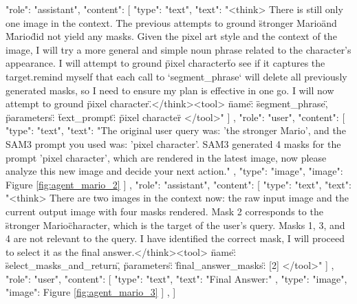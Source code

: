     {
        "role": "assistant",
        "content": [
            {
                "type": "text",
                "text": "<think> There is still only one image in the context. The previous attempts to ground \"stronger Mario\" and \"Mario\" did not yield any masks. Given the pixel art style and the context of the image, I will try a more general and simple noun phrase related to the character's appearance. I will attempt to ground \"pixel character\" to see if it captures the target.\n\nI remind myself that each call to `segment_phrase` will delete all previously generated masks, so I need to ensure my plan is effective in one go. I will now attempt to ground \"pixel character.\"\n\n</think>\n<tool> {\"name\": \"segment_phrase\", \"parameters\": {\"text_prompt\": \"pixel character\"}} </tool>\n\n"
            }
        ]
    },
    {
        "role": "user",
        "content": [
            {
                "type": "text",
                "text": "The original user query was: 'the stronger Mario', and the SAM3 prompt you used was: 'pixel character'. SAM3 generated 4 masks for the prompt 'pixel character', which are rendered in the latest image, now please analyze this new image and decide your next action."
            },
            {
                "type": "image",
                "image": Figure {\ref{fig:agent_mario_2}}
            }
        ]
    },
    {
        "role": "assistant",
        "content": [
            {
                "type": "text",
                "text": "<think> There are two images in the context now: the raw input image and the current output image with four masks rendered. Mask 2 corresponds to the \"stronger Mario\" character, which is the target of the user's query. Masks 1, 3, and 4 are not relevant to the query. \n\nSince I have identified the correct mask, I will proceed to select it as the final answer.\n\n</think>\n<tool> {\"name\": \"select_masks_and_return\", \"parameters\": {\"final_answer_masks\": [2]}} </tool>"
            }
        ]
    },
    {
        "role": "user",
        "content": [
            {
                "type": "text",
                "text": "Final Answer:"
            },
            {
                "type": "image",
                "image": Figure {\ref{fig:agent_mario_3}}
            }
        ]
    },
]
